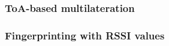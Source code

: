 
\subsubsection{\ac{ToA}-based multilateration}


\subsubsection{Fingerprinting with \ac{RSSI} values}

